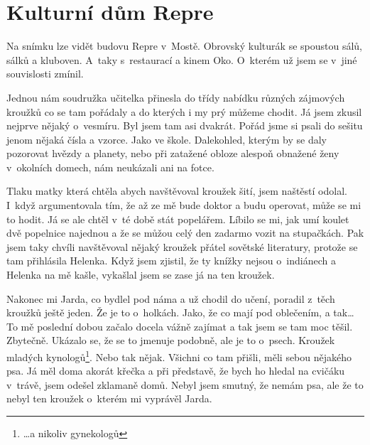 

\chapter{Kulturní dům Repre}

Na snímku lze vidět budovu Repre v~Mostě. Obrovský kulturák se spoustou sálů,
sálků a kluboven. A~taky s~restaurací a kinem Oko. O~kterém už jsem se v~jiné
souvislosti zmínil.

Jednou nám soudružka učitelka přinesla do třídy nabídku různých zájmových
kroužků co se tam pořádaly a do kterých i my prý můžeme chodit. Já jsem zkusil
nejprve nějaký o~vesmíru. Byl jsem tam asi dvakrát. Pořád jsme si psali do
sešitu jenom nějaká čísla a vzorce. Jako ve škole. Dalekohled, kterým by se
daly pozorovat hvězdy a planety, nebo při zatažené obloze alespoň obnažené ženy
v~okolních domech, nám neukázali ani na fotce.

Tlaku matky která chtěla abych navštěvoval kroužek šití, jsem naštěstí odolal.
I~když argumentovala tím, že až ze mě bude doktor a budu operovat, může se mi
to hodit. Já se ale chtěl v~té době stát popelářem. Líbilo se mi, jak umí
koulet dvě popelnice najednou a že se můžou celý den zadarmo vozit na
stupačkách. Pak jsem taky chvíli navštěvoval nějaký kroužek přátel sovětské
literatury, protože se tam přihlásila Helenka. Když jsem zjistil, že ty knížky
nejsou o~indiánech a Helenka na mě kašle, vykašlal jsem se zase já na ten
kroužek.

Nakonec mi Jarda, co bydlel pod náma a už chodil do učení, poradil z~těch
kroužků ještě jeden. Že je to o~holkách. Jako, že co mají pod oblečením, a
tak\dots{} To mě poslední dobou začalo docela vážně zajímat a tak jsem se tam
moc těšil. Zbytečně. Ukázalo se, že se to jmenuje podobně, ale je to o~psech.
Kroužek mladých kynologů\footnote{\dots{}a nikoliv gynekologů}. Nebo tak nějak.
Všichni co tam přišli, měli sebou nějakého psa. Já měl doma akorát křečka a při
představě, že bych ho hledal na cvičáku v~trávě, jsem odešel zklamaně domů.
Nebyl jsem smutný, že nemám psa, ale že to nebyl ten kroužek o~kterém mi
vyprávěl Jarda.

